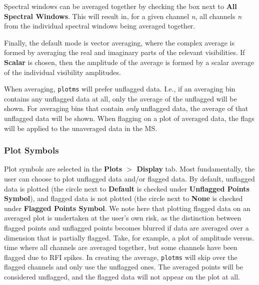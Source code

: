 Spectral windows can be averaged together by checking the box next to {\bf All Spectral Windows}. This will result in, for a given channel {\it n}, all channels {\it n} from the individual spectral windows being averaged together. 

Finally, the default mode is vector averaging, where the complex average is formed by averaging the real and imaginary parts of the relevant visibilities.  If {\bf Scalar} is chosen, then the amplitude of the average is formed by a scalar average of the individual visibility amplitudes.

When averaging, {\tt plotms} will prefer unflagged data.  I.e., if an averaging bin contains any unflagged
data at all, only the average of the unflagged will be shown.  For averaging bins that contain {\em only} unflagged data, the average of that unflagged data will be shown.  When flagging on a plot of averaged
data, the flags will be applied to the unaveraged data in the MS.


\subsubsection{Plot Symbols}
\label{section:edit.plot.plotms.symbol}

Plot symbols are selected in the {\bf Plots $>$ Display} tab. Most fundamentally, the user can choose to plot unflagged data and/or flagged data. By default, unflagged data is plotted (the circle next to {\bf Default} is checked under {\bf Unflagged Points Symbol}), and flagged data is not plotted (the circle next to {\bf None} is checked under {\bf Flagged Points Symbol}. We note here that plotting flagged data on an averaged plot is undertaken at the user's own risk, as the distinction between flagged points and unflagged points becomes blurred if data are averaged over a dimension that is partially flagged. Take, for example, a plot of amplitude versus. time where all channels are averaged together, but some channels have been flagged due to RFI spikes. In creating the average, {\tt plotms} will skip over the flagged channels and only use the unflagged ones. The averaged points will be considered unflagged, and the flagged data will not appear on the plot at all.

